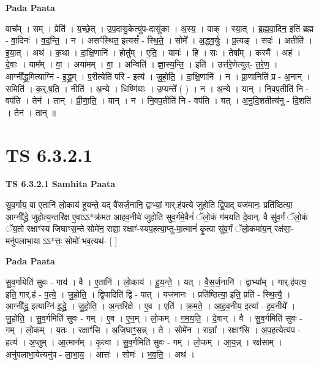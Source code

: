 \documentclass[17pt]{extarticle}
\begin{document}
\textbf{Pada Paata} \newline

वाच᳚म् । सम् । प्रेति॑ । य॒च्छे॒त् । उ॒प॒दासु॒केत्यु॑प-दासु॑का । अ॒स्य॒ । वाक् । स्या॒त् । ब्र॒ह्म॒वा॒दिन॒ इति॑ ब्रह्म - वा॒दिनः॑ । व॒द॒न्ति॒ । न । असꣳ॑स्थित॒ इत्यसं᳚ - स्थि॒ते॒ । सोमे᳚ । अ॒द्ध्व॒र्युः । प्र॒त्यङ् । सदः॑ । अतीति॑ । इ॒या॒त् । अथ॑ । क॒था । दा॒क्षि॒णानि॑ । होतु᳚म् । ए॒ति॒ । यामः॑ । हि । सः । तेषा᳚म् । कस्मै᳚ । अह॑ । दे॒वाः । याम᳚म् । वा॒ । अया॑मम् । वा॒ । अन्विति॑ । ज्ञा॒स्य॒न्ति॒ । इति॑ । उत्त॑रे॒णेत्युत्- त॒रे॒ण॒ । आग्नी᳚द्ध्र॒मित्याग्नि॑ - इ॒द्ध्र॒म् । प॒रीत्येति॑ परि - इत्य॑ । जु॒हो॒ति॒ । दा॒क्षि॒णानि॑ । न । प्रा॒णानिति॑ प्र - अ॒नान् । समिति॑ । क॒र्॒.ष॒ति॒ । नीति॑ । अ॒न्ये । धिष्णि॑याः । उ॒प्यन्ते᳚ ( ) । न । अ॒न्ये । यान् । नि॒वप॒तीति॑ नि - वप॑ति । तेन॑ । तान् । प्री॒णा॒ति॒ । यान् । न । नि॒वप॒तीति॑ नि - वप॑ति । यत् । अ॒नु॒दि॒शतीत्य॑नु - दि॒शति॑ । तेन॑ । तान् ॥  \newline




\section*{ TS 6.3.2.1 }

\textbf{TS 6.3.2.1 } \newline
\textbf{Samhita Paata} \newline

सु॒व॒र्गाय॒ वा ए॒तानि॑ लो॒काय॑ हूयन्ते॒ यद् वै॑सर्ज॒नानि॒ द्वाभ्यां॒ गार्.ह॑पत्ये जुहोति द्वि॒पाद् यज॑मानः॒ प्रति॑ष्ठित्या॒ आग्नी᳚द्ध्रे जुहोत्य॒न्तरि॑क्ष ए॒वाऽऽ*क्र॑मत आहव॒नीये॑ जुहोति सुव॒र्गमे॒वैनं॑ ॅलो॒कं ग॑मयति दे॒वान्. वै सु॑व॒र्गं ॅलो॒कं ॅय॒तो रक्षाꣳ॑स्य जिघाꣳस॒न्ते सोमे॑न॒ राज्ञा॒ रक्षाꣳ॑-स्यप॒हत्या॒प्तु-मा॒त्मानं॑ कृ॒त्वा सु॑व॒र्गं ॅलो॒कमा॑य॒न् रक्ष॑सा॒-मनु॑पलाभा॒या ऽऽ*त्तः॒ सोमो॑ भव॒त्यथ॑- [  ] \newline

\textbf{Pada Paata} \newline

सु॒व॒र्गायेति॑ सुवः - गाय॑ । वै । ए॒तानि॑ । लो॒काय॑ । हू॒य॒न्ते॒ । यत् । वै॒स॒र्ज॒नानि॑ । द्वाभ्या᳚म् । गार्.ह॑पत्य॒ इति॒ गार्.ह॑ - प॒त्ये॒ । जु॒हो॒ति॒ । द्वि॒पादिति॑ द्वि - पात् । यज॑मानः । प्रति॑ष्ठित्या॒ इति॒ प्रति॑ - स्थि॒त्यै॒ । आग्नी᳚द्ध्र॒ इत्याग्नि॑-इ॒द्ध्रे॒ । जु॒हो॒ति॒ । अ॒न्तरि॑क्षे । ए॒व । एति॑ । क्र॒म॒ते॒ । आ॒ह॒व॒नीय॒ इत्या᳚ - ह॒व॒नीये᳚ । जु॒हो॒ति॒ । सु॒व॒र्गमिति॑ सुवः - गम् । ए॒व । ए॒न॒म् । लो॒कम् । ग॒म॒य॒ति॒ । दे॒वान् । वै । सु॒व॒र्गमिति॑ सुवः - गम् । लो॒कम् । य॒तः । रक्षाꣳ॑सि । अ॒जि॒घाꣳ॒॒स॒न्न् । ते । सोमे॑न । राज्ञा᳚ । रक्षाꣳ॑सि । अ॒प॒हत्येत्य॑प - हत्य॑ । अ॒प्तुम् । आ॒त्मान᳚म् । कृ॒त्वा । सु॒व॒र्गमिति॑ सुवः - गम् । लो॒कम् । आ॒य॒न्न् । रक्ष॑साम् । अनु॑पलाभा॒येत्यनु॑प - ला॒भा॒य॒ । आत्तः॑ । सोमः॑ । भ॒व॒ति॒ । अथ॑ ।  \newline
\end{document}
